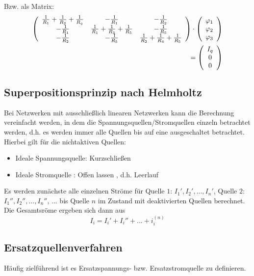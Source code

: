\documentclass[12pt,a4paper]{article}%
\numberwithin{equation}{section}
\def\vecT#1{\left(\begin{array}{c} #1 \end{array}\right)}
\begin{document}
  Bzw. als Matrix:
  \begin{align}
    \left(
      \begin{array}{c c c}
      \frac{1}{R_1} + \frac{1}{R_2} + \frac{1}{R_q} & -\frac{1}{R_1}                                & -\frac{1}{R_2} \\
      -\frac{1}{R_1}                                & \frac{1}{R_1} + \frac{1}{R_3} + \frac{1}{R_5} & -\frac{1}{R_5} \\
      -\frac{1}{R_2}                                & -\frac{1}{R_5}                                & \frac{1}{R_2} + \frac{1}{R_4} + \frac{1}{R_5} \\
      \end{array}
    \right) \cdot \vecT{\varphi_1 \\ \varphi_2 \\ \varphi_3} \nonumber \\
    = \vecT{I_q \\ 0 \\0}
  \end{align}
  
  \subsection{Superpositionsprinzip nach Helmholtz}
  Bei Netzwerken mit ausschließlich linearen Netzwerken kann die Berechnung vereinfacht werden, in dem die Spannungsquellen/Stromquellen einzeln betrachtet werden, d.h. es werden immer alle Quellen bis auf eine \dq ausgeschaltet \dq betrachtet. Hierbei gilt für die nichtaktiven Quellen:
  \begin{itemize}
    \item Ideale Spannungsquelle: Kurzschließen
    \item Ideale Stromquelle    : \dq Offen lassen \dq, d.h. Leerlauf  
  \end{itemize}
  Es werden zunächste alle einzelnen Ströme für Quelle $1$: $I_1', I_2', ..., I_n'$, Quelle $2$:$I_1'', I_2'', ..., I_n''$, ... bis Quelle $n$  im Zustand mit deaktivierten Quellen berechnet. Die Gesamtsröme ergeben sich dann aus 
  \begin{equation}
    I_i = I_i' + I_i'' + ... + i_i^{(n)}
  \end{equation}
  
  \subsection{Ersatzquellenverfahren}
  Häufig zielführend ist es Ersatzspannungs- bzw. Ersatzstromquelle zu definieren.
\newpage
\end{document}
